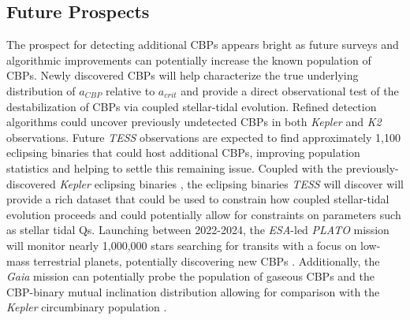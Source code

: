 
\subsection{Future Prospects}

The prospect for detecting additional CBPs appears bright as future surveys and algorithmic improvements can potentially increase the known population of CBPs.  Newly discovered CBPs will help characterize the true underlying distribution of $a_{CBP}$ relative to $a_{crit}$ and provide a direct observational test of the destabilization of CBPs via coupled stellar-tidal evolution.  Refined detection algorithms could uncover previously undetected CBPs in both {\it Kepler} and {\it K2} observations.  Future {\it TESS} observations are expected to find approximately 1,100 eclipsing binaries \citep{Sullivan2015} that could host additional CBPs, improving population statistics and helping to settle this remaining issue.  Coupled with the previously-discovered {\it Kepler} eclipsing binaries \citep{Kirk2016}, the eclipsing binaries {\it TESS} will discover will provide a rich dataset that could be used to constrain how coupled stellar-tidal evolution proceeds and could potentially allow for constraints on parameters such as stellar tidal Qs.  Launching between 2022-2024, the {\it ESA}-led {\it PLATO} mission will monitor nearly 1,000,000 stars searching for transits with a focus on low-mass terrestrial planets, potentially discovering new CBPs \citep{Rauer2014}.  Additionally, the {\it Gaia} mission can potentially probe the population of gaseous CBPs and the CBP-binary mutual inclination distribution allowing for comparison with the {\it Kepler} circumbinary population \citep{Sahlmann2015}.  

